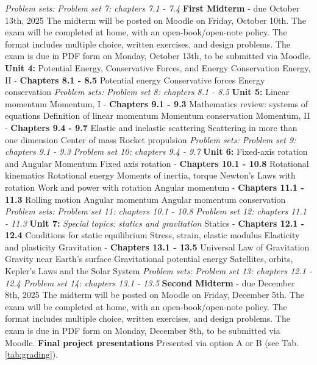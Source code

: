 \documentclass[10pt]{article}
\begin{document}
\begin{outline}[enumerate]
\2 \textit{Problem sets:}
\3 \textit{Problem set 7: chapters 7.1 - 7.4}
\1 \textbf{First Midterm} - due October 13th, 2025
\2 The midterm will be posted on Moodle on Friday, October 10th.
\2 The exam will be completed at home, with an open-book/open-note policy.  The format includes multiple choice, written exercises, and design problems.
\2 The exam is due in PDF form on Monday, October 13th, to be submitted via Moodle.
\1 \textbf{Unit 4:} Potential Energy, Conservative Forces, and Energy Conservation
\2 Energy, II - \textbf{Chapters 8.1 - 8.5}
\3 Potential energy
\3 Conservative forces
\3 Energy conservation
\3 \textit{Problem sets:}
\4 \textit{Problem set 8: chapters 8.1 - 8.5}
\1 \textbf{Unit 5:} Linear momentum
\2 Momentum, I - \textbf{Chapters 9.1 - 9.3}
\3 Mathematics review: systems of equations
\3 Definition of linear momentum
\3 Momentum conservation
\2 Momentum, II - \textbf{Chapters 9.4 - 9.7}
\3 Elastic and inelastic scattering
\3 Scattering in more than one dimension
\3 Center of mass
\3 Rocket propulsion
\2 \textit{Problem sets:}
\3 \textit{Problem set 9: chapters 9.1 - 9.3}
\3 \textit{Problem set 10: chapters 9.4 - 9.7}
\1 \textbf{Unit 6:} Fixed-axis rotation and Angular Momentum
\2 Fixed axis rotation - \textbf{Chapters 10.1 - 10.8}
\3 Rotational kinematics
\3 Rotational energy
\3 Moments of inertia, torque
\3 Newton's Laws with rotation
\3 Work and power with rotation
\2 Angular momentum - \textbf{Chapters 11.1 - 11.3}
\3 Rolling motion
\3 Angular momentum
\3 Angular momentum conservation
\2 \textit{Problem sets:}
\3 \textit{Problem set 11: chapters 10.1 - 10.8}
\3 \textit{Problem set 12: chapters 11.1 - 11.3}
\1 \textbf{Unit 7:} \textit{Special topics: statics and gravitation}
\2 Statics - \textbf{Chapters 12.1 - 12.4}
\3 Conditions for static equilibrium
\3 Stress, strain, elastic modulus
\3 Elasticity and plasticity
\2 Gravitation - \textbf{Chapters 13.1 - 13.5}
\3 Universal Law of Gravitation
\3 Gravity near Earth's surface
\3 Gravitational potential energy
\3 Satellites, orbits, Kepler's Laws and the Solar System
\2 \textit{Problem sets:}
\3 \textit{Problem set 13: chapters 12.1 - 12.4}
\3 \textit{Problem set 14: chapters 13.1 - 13.5}
\1 \textbf{Second Midterm} - due December 8th, 2025
\2 The midterm will be posted on Moodle on Friday, December 5th.
\2 The exam will be completed at home, with an open-book/open-note policy.  The format includes multiple choice, written exercises, and design problems.
\2 The exam is due in PDF form on Monday, December 8th, to be submitted via Moodle.
\1 \textbf{Final project presentations}
\2 Presented via option A or B (see Tab. \ref{tab:grading}).

\end{outline}
\end{document}
